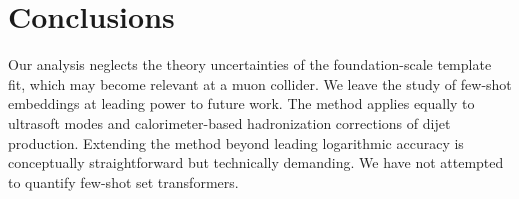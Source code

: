 \section{Conclusions}\label{sec:conclusions}

Our analysis neglects the theory uncertainties of the foundation-scale
template fit, which may become relevant at a muon collider. We leave the
study of few-shot embeddings at leading power to future work. The method
applies equally to ultrasoft modes and calorimeter-based hadronization
corrections of dijet production. Extending the method beyond leading
logarithmic accuracy is conceptually straightforward but technically
demanding. We have not attempted to quantify few-shot set transformers.

